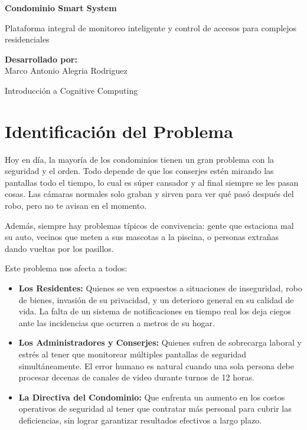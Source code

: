 \documentclass[12pt,a4paper]{article}
\begin{document}
\begin{titlepage}
    \centering
    \vspace*{2cm}
    
    \Huge
    \textbf{Condominio Smart System}
    
    \vspace{1.5cm}
    
    \Large
    Plataforma integral de monitoreo inteligente y control de accesos para complejos residenciales
    
    \vspace{3cm}
    
    \textbf{Desarrollado por:} \\
    \vspace{0.5cm}
    Marco Antonio Alegria Rodriguez
    
    \vfill
    
    \normalsize
    Introducción a Cognitive Computing
    
\end{titlepage}

\newpage
\tableofcontents
\newpage

\section{Identificación del Problema}
Hoy en día, la mayoría de los condominios tienen un gran problema con la seguridad y el orden. Todo depende de que los conserjes estén mirando las pantallas todo el tiempo, lo cual es súper cansador y al final siempre se les pasan cosas. Las cámaras normales solo graban y sirven para ver qué pasó después del robo, pero no te avisan en el momento.

Además, siempre hay problemas típicos de convivencia: gente que estaciona mal su auto, vecinos que meten a sus mascotas a la piscina, o personas extrañas dando vueltas por los pasillos.

Este problema nos afecta a todos:
\begin{itemize}
    \item \textbf{Los Residentes:} Quienes se ven expuestos a situaciones de inseguridad, robo de bienes, invasión de su privacidad, y un deterioro general en su calidad de vida. La falta de un sistema de notificaciones en tiempo real los deja ciegos ante las incidencias que ocurren a metros de su hogar.
    \item \textbf{Los Administradores y Conserjes:} Quienes sufren de sobrecarga laboral y estrés al tener que monitorear múltiples pantallas de seguridad simultáneamente. El error humano es natural cuando una sola persona debe procesar decenas de canales de video durante turnos de 12 horas.
    \item \textbf{La Directiva del Condominio:} Que enfrenta un aumento en los costos operativos de seguridad al tener que contratar más personal para cubrir las deficiencias, sin lograr garantizar resultados efectivos a largo plazo.
\end{itemize}
\end{document}
